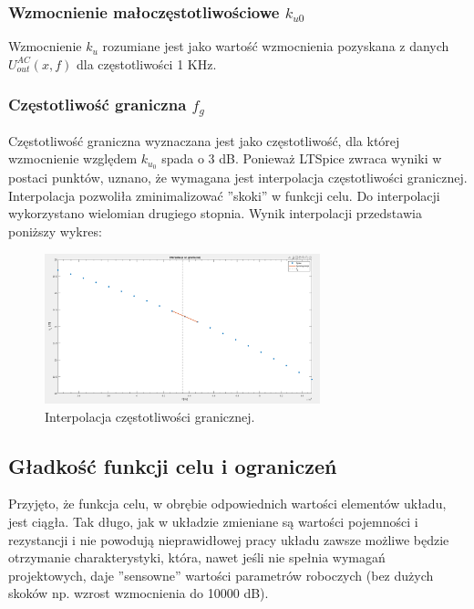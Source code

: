 \documentclass{article}
\begin{document}
\subsubsection*{Wzmocnienie małoczęstotliwościowe $k_{u0}$}
Wzmocnienie $k_u$ rozumiane jest jako wartość wzmocnienia pozyskana z danych $U^{AC}_{out}(x,f)$ dla częstotliwości 1 KHz.

\subsubsection*{Częstotliwość graniczna $f_g$}
Częstotliwość graniczna wyznaczana jest jako częstotliwość, dla której wzmocnienie względem $k_{u{_0}}$ spada o 3 dB.
Ponieważ LTSpice zwraca wyniki w postaci punktów, uznano, że wymagana jest interpolacja częstotliwości granicznej. Interpolacja pozwoliła zminimalizować ''skoki'' w funkcji celu. Do interpolacji wykorzystano wielomian drugiego stopnia. Wynik interpolacji przedstawia poniższy wykres:
\begin{figure}[h]
	\includegraphics[width=8cm]{graphics/fg_interp.png}
	\centering
	\caption{Interpolacja częstotliwości granicznej.}
\end{figure}




\subsection{Gładkość funkcji celu i ograniczeń}
Przyjęto, że funkcja celu, w obrębie odpowiednich wartości elementów układu, jest ciągła. Tak długo, jak w układzie zmieniane są wartości pojemności i rezystancji i
nie powodują nieprawidłowej pracy układu zawsze możliwe będzie otrzymanie charakterystyki, która, nawet jeśli nie spełnia wymagań projektowych, daje ''sensowne'' wartości parametrów roboczych (bez dużych skoków
np. wzrost wzmocnienia do 10000 dB).
\end{document}

